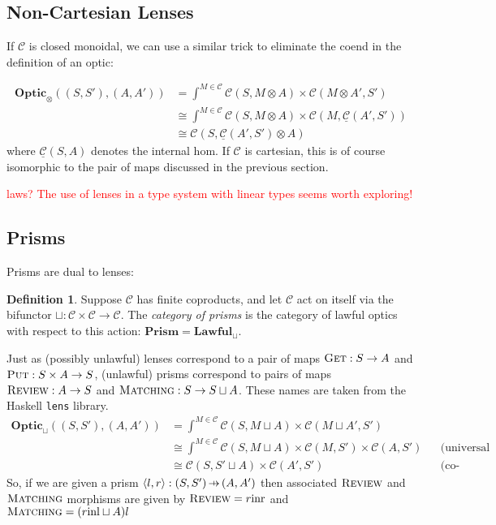 \documentclass[11pt,a4paper]{article}
\theoremstyle{plain}
\theoremstyle{definition}
\newtheorem{definition}[theorem]{Definition}
\newcommand{\C}{\mathscr{C}}
\newcommand{\homC}{\underline{\C}}
\newcommand{\Optic}{\mathbf{Optic}}
\newcommand{\Lawful}{\mathbf{Lawful}}
\newcommand{\Prism}{\mathbf{Prism}}
\newcommand{\inl}{\mathrm{inl}}
\newcommand{\inr}{\mathrm{inr}}
\newcommand{\fget}{\textsc{Get}}
\newcommand{\fput}{\textsc{Put}}
\newcommand{\freview}{\textsc{Review}}
\newcommand{\fmatching}{\textsc{Matching}}
\newcommand{\hto}{\ensuremath{\,\mathaccent\shortmid\rightarrow\,}}
\newcommand{\todo}[1]{\textcolor{red}{\small #1}}
\begin{document}
\subsection{Non-Cartesian Lenses}
If $\C$ is closed monoidal, we can use a similar trick to eliminate the coend in the definition of an optic:

\begin{align*}
\Optic_\otimes((S, S'), (A, A')) &= \int^{M \in \C} \C(S, M \otimes A) \times \C(M \otimes A', S') \\
&\cong \int^{M \in \C} \C(S, M \otimes A) \times \C(M, \homC(A',S')) \\
&\cong \C(S, \homC(A',S') \otimes A)
\end{align*}
where $\homC(S, A)$ denotes the internal hom. If $\C$ is cartesian, this is of course isomorphic to the pair of maps discussed in the previous section. 

\todo{laws?}
\todo{The use of lenses in a type system with linear types seems worth exploring!}

\subsection{Prisms}
Prisms are dual to lenses:

\begin{definition}
Suppose $\C$ has finite coproducts, and let $\C$ act on itself via the bifunctor $\sqcup : \C \times \C \to \C$. The \emph{category of prisms} is the category of lawful optics with respect to this action: $\Prism = \Lawful_\sqcup$.
\end{definition}

Just as (possibly unlawful) lenses correspond to a pair of maps $\fget : S \to A$ and $\fput : S \times A \to S$, (unlawful) prisms correspond to pairs of maps $\freview : A \to S$ and $\fmatching : S \to S \sqcup A$. These names are taken from the Haskell \texttt{lens} library.
\begin{align*}
\Optic_\sqcup((S, S'), (A, A')) &= \int^{M \in \C} \C(S, M \sqcup A) \times \C(M \sqcup A', S') \\
&\cong \int^{M \in \C} \C(S, M \sqcup A) \times \C(M, S') \times \C(A, S') && \text{(universal property of coproduct)} \\
&\cong \C(S, S' \sqcup A) \times \C(A', S') && \text{(co-Yoneda)}
\end{align*}
So, if we are given a prism $\langle l, r \rangle : (S, S') \hto (A, A')$ then associated $\freview$ and $\fmatching$ morphisms are given by $\freview = r \inr$ and $\fmatching = (r\inl \sqcup A)l$
\end{document}
